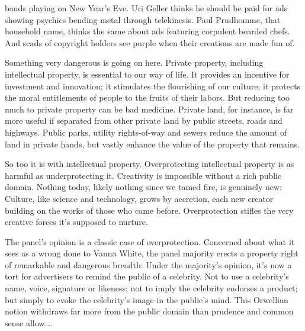 bands playing on New Year's Eve. Uri Geller
thinks he should be paid for ads showing psychics bending metal through
telekinesis. Paul Prudhomme,
that household name, thinks the same about ads featuring corpulent bearded
chefs. And scads of copyright holders see purple when their
creations are made fun of.

Something very dangerous is going on here. Private property, including
intellectual property, is essential to our way of life. It provides an
incentive for investment and innovation; it stimulates the flourishing of our
culture; it protects the moral entitlements of people to the fruits of their
labors. But reducing too much to private property can be bad medicine. Private
land, for instance, is far more useful if separated from other private land by
public streets, roads and highways. Public parks, utility rights-of-way and
sewers reduce the amount of land in private hands, but vastly enhance the value
of the property that remains.

So too it is with intellectual property. Overprotecting intellectual property is
as harmful as underprotecting it. Creativity is impossible without a rich
public domain. Nothing today, likely nothing since we tamed fire, is genuinely
new: Culture, like science and technology, grows by accretion, each new creator
building on the works of those who came before. Overprotection stifles the very
creative forces it's supposed to nurture.

The panel's opinion is a classic case of overprotection. Concerned about what it
sees as a wrong done to Vanna White, the panel majority erects a property right
of remarkable and dangerous breadth: Under the majority's opinion, it's now a
tort for advertisers to remind the public of a celebrity. Not to use a
celebrity's name, voice, signature or likeness; not to imply the celebrity
endorses a product; but simply to evoke the celebrity's image in the public's
mind. This Orwellian notion withdraws far more from the public domain than
prudence and common sense allow.\dots

